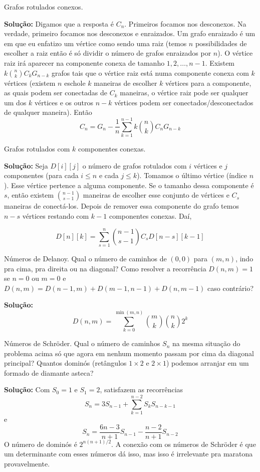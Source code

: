  Grafos rotulados conexos.

\textbf{Solução:} Digamos que a resposta é $C_n$. Primeiros focamos nos desconexos. Na verdade, primeiro focamos nos desconexos e enraizados. Um grafo enraizado é um em que eu enfatizo um vértice como sendo uma raiz (temos $n$ possibilidades de escolher a raiz então é só dividir o número de grafos enraizados por $n$). O vértice raiz irá aparecer na componente conexa de tamanho $1, 2, \dots, n-1$. Existem $k {n \choose k} C_k G_{n-k}$ grafos tais que o vértice raiz está numa componente conexa com $k$ vértices (existem $n$ eschole $k$ maneiras de escolher $k$ vértices para a componente, as quais podem ser conectadas de $C_k$ maneiras, o vértice raiz pode ser qualquer um dos $k$ vértices e os outros $n-k$ vértices podem ser conectados/desconectados de qualquer maneira). Então
$$C_n = G_n - \dfrac{1}{n} \sum\limits_{k=1}^{n-1} k {n \choose k} C_n G_{n-k}$$

 Grafos rotulados com $k$ componentes conexas. 

\textbf{Solução:} Seja $D[i][j]$ o número de grafos rotulados com $i$ vértices e $j$ componentes (para cada $i \leq n$ e cada $j \leq k$). Tomamos o último vértice (índice $n$). Esse vértice pertence a alguma componente. Se o tamanho dessa componente é $s$, então existem ${n-1 \choose s-1}$ maneiras de escolher esse conjunto de vértices e $C_s$ maneiras de conectá-los. Depois de remover essa componente do grafo temos $n-s$ vértices restando com $k-1$ componentes conexas. Daí,

$$D[n][k] = \sum\limits_{s=1}^n {n-1 \choose s-1} C_s D[n-s][k-1]$$

 Números de Delanoy. Qual o número de caminhos de $(0, 0)$ para $(m, n)$, indo pra cima, pra direita ou na diagonal? Como resolver a recorrência $D(n, m) = 1$ se $n=0$ ou $m=0$ e $D(n, m) = D(n-1, m) + D(m-1, n-1) +D(n, m-1)$ caso contrário?

\textbf{Solução:} $$D(n, m) = \sum\limits_{k=0}^{\min(m, n)} {m \choose k} {n \choose k} 2^k$$

 Números de Schröder. Qual o número de caminhos $S_n$ na mesma situação do problema acima só que agora em nenhum momento passam por cima da diagonal principal? Quantos dominós (retângulos $1\times2$ e $2 \times1$) podemos arranjar em um formado de diamante asteca?

\textbf{Solução:} Com $S_0=1$ e $S_1=2$, satisfazem as recorrências
$$S_n = 3S_{n-1} + \sum\limits_{k=1}^{n-2} S_k S_{n-k-1}$$
e
$$S_n = \dfrac{6n-3}{n+1} S_{n-1} - \dfrac{n-2}{n+1}S_{n-2}$$
O número de dominós é $2^{n(n+1)/2}$. A conexão com os números de Schröder é que um determinante com esses números dá isso, mas isso é irrelevante pra maratona provavelmente.


